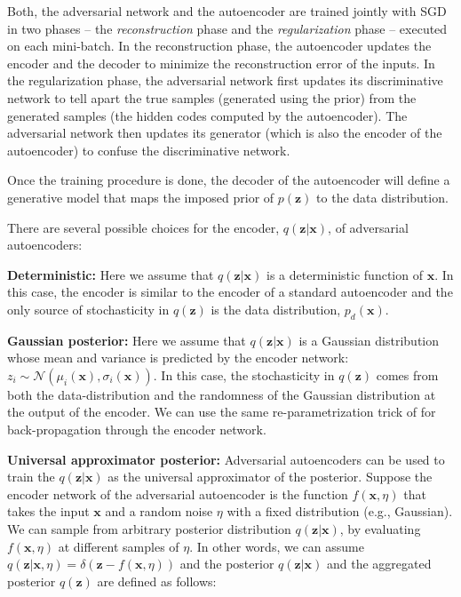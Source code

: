 \documentclass{article}
\begin{document}
Both, the adversarial network and the autoencoder are trained jointly with SGD in two phases -- the \emph{reconstruction} phase and the \emph{regularization}
phase -- executed on each mini-batch.  In the reconstruction phase, the autoencoder updates the encoder and the decoder to minimize the reconstruction error
of the inputs. In the regularization phase, the adversarial network first updates its discriminative network to tell apart the true samples (generated
using the prior) from the generated samples (the hidden codes computed by the autoencoder). The adversarial network then updates its generator (which is also the encoder of the autoencoder)
to confuse the discriminative network.

Once the training procedure is done, the decoder of the autoencoder will define a generative model that maps the imposed prior of $p(\mathbf{z})$ to the data distribution.

There are several possible choices for the encoder, $q(\mathbf{z}|\mathbf{x})$, of adversarial autoencoders:

{\bf Deterministic:} Here we assume that $q(\mathbf{z}|\mathbf{x})$ is a deterministic function of $\mathbf{x}$. In this case, the encoder is similar to the encoder of a standard autoencoder and the only source of stochasticity in $q(\mathbf{z})$ is the data distribution, $p_{d} (\mathbf{x})$.

{\bf Gaussian posterior:} Here we assume that $q(\mathbf{z}|\mathbf{x})$ is a Gaussian distribution whose mean and variance is predicted by the encoder network: $z_i \sim  \mathcal{N}(\mu_i(\mathbf{x}),\sigma_i(\mathbf{x}))$. In this case, the stochasticity in $q(\mathbf{z})$ comes from both the data-distribution and the randomness of the Gaussian distribution at the output of the encoder. We can use the same re-parametrization trick of \citep{vae} for back-propagation through the encoder network.

{\bf Universal approximator posterior:} Adversarial autoencoders can be used to train the $q(\mathbf{z}|\mathbf{x})$ as the universal approximator of the posterior. Suppose the encoder network of the adversarial autoencoder is the function $f(\mathbf{x},\eta)$ that takes the input $\mathbf{x}$ and a random noise $\eta$ with a fixed distribution (e.g., Gaussian). We can sample from arbitrary posterior distribution $q(\mathbf{z}|\mathbf{x})$, by evaluating $f(\mathbf{x},\eta)$ at different samples of $\eta$. In other words, we can assume $q(\mathbf{z}|\mathbf{x},\eta)=\delta(\mathbf{z} - f(\mathbf{x},\eta))$ and the posterior $q(\mathbf{z}|\mathbf{x})$ and the aggregated posterior $q(\mathbf{z})$ are defined as follows:
\end{document}
